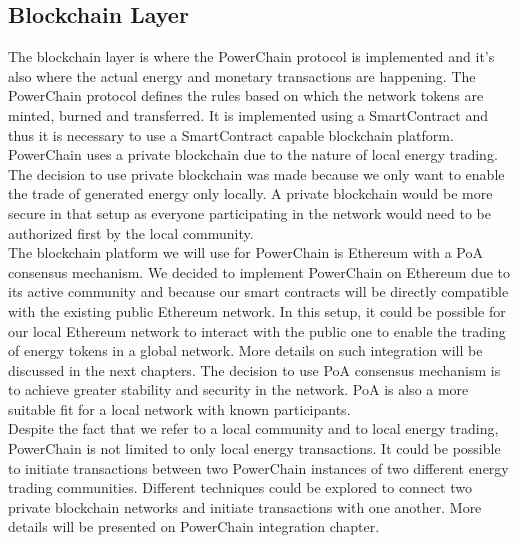 \subsection{Blockchain Layer}
The blockchain layer is where the PowerChain protocol is implemented and it's also where the actual energy and monetary transactions are happening. The PowerChain protocol defines the rules based on which the network tokens are minted,
burned and transferred. It is implemented using a SmartContract and thus it is necessary to use a SmartContract capable blockchain platform.
PowerChain uses a private blockchain due to the nature of local energy trading. The decision to use private blockchain was made because we only want to enable the trade of generated energy only locally. A private
blockchain would be more secure in that setup as everyone participating in the network would need to be authorized first by the local community.\\
The blockchain platform we will use for PowerChain is Ethereum with a PoA consensus mechanism. We decided to implement PowerChain on Ethereum due to its active community and because our smart contracts will be directly compatible with the
existing public Ethereum network. In this setup, it could be possible for our local Ethereum network to interact with the public one to enable the trading of energy tokens in a global network. More details on such integration will be
discussed in the next chapters. The decision to use PoA consensus mechanism is to achieve greater stability and security in the network. PoA is also a more suitable fit for a local network with known participants. \cite{manolache2022decision} \\
Despite the fact that we refer to a local community and to local energy trading, PowerChain is not limited to only local energy transactions. It could be possible to initiate transactions between two PowerChain instances of two different
energy trading communities. Different techniques could be explored to connect two private blockchain networks and initiate transactions with one another. More details will be presented on PowerChain integration chapter.


